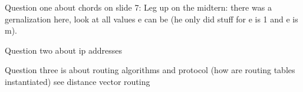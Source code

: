 \documentclass[12pt]{article}
\begin{document}
Question one about chords on slide 7: Leg up on the midtern: there was a gernalization here, look at all values e can be (he only did stuff for e is 1 and e is m).

Question two about ip addresses

Question three is about routing algorithms and protocol (how are routing tables instantiated) see distance vector routing
\end{document}
